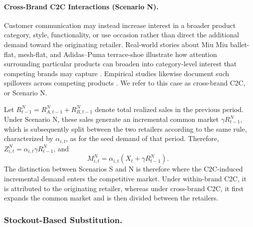 \documentclass[nonblindrev,copyedit]{informs1}
\begin{document}
\paragraph{Cross-Brand C2C Interactions (Scenario N).}
Customer communication may instead increase interest in a broader product category, style, functionality, or use occasion rather than direct the additional demand toward the originating retailer. Real-world stories about Miu Miu ballet-flat, mesh-flat, and Adidas--Puma terrace-shoe illustrate how attention surrounding particular products can broaden into category-level interest that competing brands may capture \citep{fashionista2022miumiu,forbes2024mesh,reuters2023terrace, reuters2024puma}. Empirical studies likewise document such spillovers across competing products \citep[e.g.,][]{cola2020,haviv2020,shi2023}. We refer to this case as cross-brand C2C, or Scenario N.

Let $R_{t-1}^N=R_{A,t-1}^N+R_{B,t-1}^N$ denote total realized sales in the previous period. Under Scenario N, these sales generate an incremental common market $\gamma R_{t-1}^N$, which is subsequently split between the two retailers according to the same rule, characterized by $\alpha_{i,t}$, as for the seed demand of that period. Therefore, $Z_{i,t}^N=\alpha_{i,t}\gamma R_{t-1}^N$, and
\begin{equation}
M_{i,t}^N=\alpha_{i,t}\left(X_t+\gamma R_{t-1}^N\right).
\label{nne}
\end{equation}
The distinction between Scenarios S and N is therefore where the C2C-induced incremental demand enters the competitive market. Under within-brand C2C, it is attributed to the originating retailer, whereas under cross-brand C2C, it first expands the common market and is then divided between the retailers.

\subsubsection{Stockout-Based Substitution.}
\end{document}
